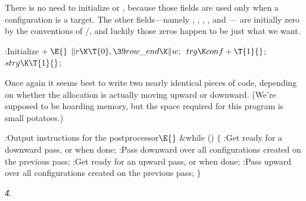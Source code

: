 There is no need to initialize  or , because
those fields are used only when a configuration is a target.
The other fields---namely , , ,
, and --- are
initially zero by the
conventions of \CEE/, and luckily those zeros happen to be just what we want.

\Y\B\4:Initialize\X${}\mathrel+\E{}$\6
$\|r\K\T{0},\39\\{row\_end}\K\|w;{}$\6
${}\\{trg}\K\\{conf}+\T{1}{}$;\6
${}\\{strg}\K\T{1}{}$;\par
\fi

Once again it seems best to write two nearly identical
pieces of
code, depending on whether the allocation is actually moving upward or
downward. (We're supposed to be hoarding memory, but the space required
for this program is small potatoes.)

\Y\B\4:Output instructions for the postprocessor\X${}\E{}$\6
\&{while} ()\5
${}\{{}$\1\6
:Get ready for a downward pass, or  when done\X;\6
:Pass downward over all configurations created on the previous pass\X;\6
:Get ready for an upward pass, or  when done\X;\6
:Pass upward over all configurations created on the previous pass\X;\6
\4${}\}{}$\2\par
\U4.\fi


